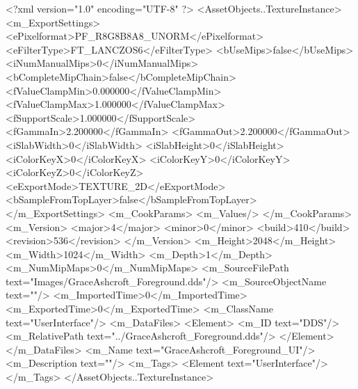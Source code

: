 <?xml version="1.0" encoding="UTF-8" ?>
<AssetObjects..TextureInstance>
	<m_ExportSettings>
		<ePixelformat>PF_R8G8B8A8_UNORM</ePixelformat>
		<eFilterType>FT_LANCZOS6</eFilterType>
		<bUseMips>false</bUseMips>
		<iNumManualMips>0</iNumManualMips>
		<bCompleteMipChain>false</bCompleteMipChain>
		<fValueClampMin>0.000000</fValueClampMin>
		<fValueClampMax>1.000000</fValueClampMax>
		<fSupportScale>1.000000</fSupportScale>
		<fGammaIn>2.200000</fGammaIn>
		<fGammaOut>2.200000</fGammaOut>
		<iSlabWidth>0</iSlabWidth>
		<iSlabHeight>0</iSlabHeight>
		<iColorKeyX>0</iColorKeyX>
		<iColorKeyY>0</iColorKeyY>
		<iColorKeyZ>0</iColorKeyZ>
		<eExportMode>TEXTURE_2D</eExportMode>
		<bSampleFromTopLayer>false</bSampleFromTopLayer>
	</m_ExportSettings>
	<m_CookParams>
		<m_Values/>
	</m_CookParams>
	<m_Version>
		<major>4</major>
		<minor>0</minor>
		<build>410</build>
		<revision>536</revision>
	</m_Version>
	<m_Height>2048</m_Height>
	<m_Width>1024</m_Width>
	<m_Depth>1</m_Depth>
	<m_NumMipMaps>0</m_NumMipMaps>
	<m_SourceFilePath text="Images/GraceAshcroft_Foreground.dds"/>
	<m_SourceObjectName text=""/>
	<m_ImportedTime>0</m_ImportedTime>
	<m_ExportedTime>0</m_ExportedTime>
	<m_ClassName text="UserInterface"/>
	<m_DataFiles>
		<Element>
			<m_ID text="DDS"/>
			<m_RelativePath text="../GraceAshcroft_Foreground.dds"/>
		</Element>
	</m_DataFiles>
	<m_Name text="GraceAshcroft_Foreground_UI"/>
	<m_Description text=""/>
	<m_Tags>
		<Element text="UserInterface"/>
	</m_Tags>
</AssetObjects..TextureInstance>
